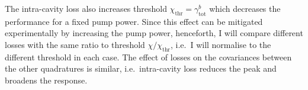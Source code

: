 The intra-cavity loss also increases threshold $\chi_\text{thr}=\gamma^b_\text{tot}$ which decreases the performance for a fixed pump power. Since this effect can be mitigated experimentally by increasing the pump power, henceforth, I will compare different losses with the same ratio to threshold $\chi/\chi_\text{thr}$, i.e.\ I will normalise to the different threshold in each case. %
The effect of losses on the covariances between the other quadratures is similar, i.e.\ intra-cavity loss reduces the peak and broadens the response.



